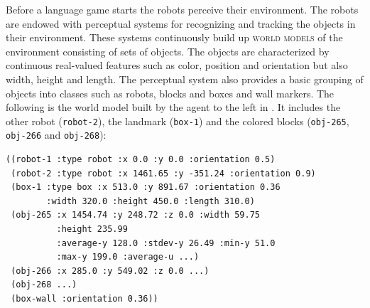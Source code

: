 Before a language game starts the robots perceive their
environment. The robots are endowed with perceptual systems 
for recognizing and tracking the objects in their environment.
These systems continuously build up \textsc{world models} of the environment
consisting of sets of objects. The objects are characterized by continuous
real-valued features such as color, position and orientation but also
width, height and length. The perceptual system also provides a basic
grouping of objects into classes such as robots, blocks and boxes and wall markers. 
The following is the world model built by the agent to the left in . It includes the other robot ({\footnotesize\texttt{robot-2}}), the
landmark ({\footnotesize\texttt{box-1}}) and the colored blocks ({\footnotesize\texttt{obj-265}},
{\footnotesize\texttt{obj-266}} and {\footnotesize\texttt{obj-268}}):\label{world-model-example}

\begin{lstlisting}
((robot-1 :type robot :x 0.0 :y 0.0 :orientation 0.5)
 (robot-2 :type robot :x 1461.65 :y -351.24 :orientation 0.9)
 (box-1 :type box :x 513.0 :y 891.67 :orientation 0.36 
        :width 320.0 :height 450.0 :length 310.0)
 (obj-265 :x 1454.74 :y 248.72 :z 0.0 :width 59.75 
          :height 235.99 
          :average-y 128.0 :stdev-y 26.49 :min-y 51.0 
          :max-y 199.0 :average-u ...)
 (obj-266 :x 285.0 :y 549.02 :z 0.0 ...)
 (obj-268 ...)
 (box-wall :orientation 0.36))
\end{lstlisting}

